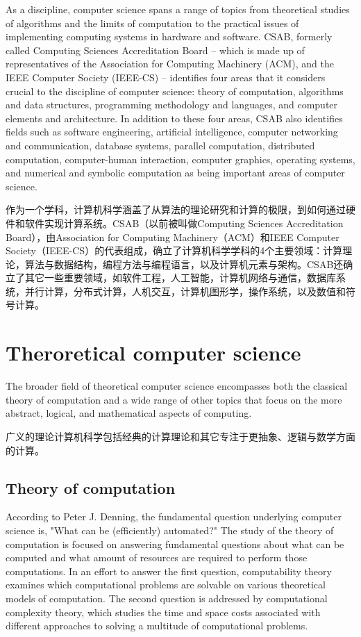 As a discipline, computer science spans a range of topics from theoretical studies of algorithms and the limits of computation to the practical issues of implementing computing systems in hardware and software. CSAB, formerly called Computing Sciences Accreditation Board – which is made up of representatives of the Association for Computing Machinery (ACM), and the IEEE Computer Society (IEEE-CS) – identifies four areas that it considers crucial to the discipline of computer science: theory of computation, algorithms and data structures, programming methodology and languages, and computer elements and architecture. In addition to these four areas, CSAB also identifies fields such as software engineering, artificial intelligence, computer networking and communication, database systems, parallel computation, distributed computation, computer-human interaction, computer graphics, operating systems, and numerical and symbolic computation as being important areas of computer science.

作为一个学科，计算机科学涵盖了从算法的理论研究和计算的极限，到如何通过硬件和软件实现计算系统。CSAB（以前被叫做Computing Sciences Accreditation Board），由Association for Computing Machinery（ACM）和IEEE Computer Society（IEEE-CS）的代表组成，确立了计算机科学学科的4个主要领域：计算理论，算法与数据结构，编程方法与编程语言，以及计算机元素与架构。CSAB还确立了其它一些重要领域，如软件工程，人工智能，计算机网络与通信，数据库系统，并行计算，分布式计算，人机交互，计算机图形学，操作系统，以及数值和符号计算。



\section{Theroretical computer science}

The broader field of theoretical computer science encompasses both the classical theory of computation and a wide range of other topics that focus on the more abstract, logical, and mathematical aspects of computing.

广义的理论计算机科学包括经典的计算理论和其它专注于更抽象、逻辑与数学方面的计算。

\subsection{Theory of computation}

According to Peter J. Denning, the fundamental question underlying computer science is, "What can be (efficiently) automated?" The study of the theory of computation is focused on answering fundamental questions about what can be computed and what amount of resources are required to perform those computations. In an effort to answer the first question, computability theory examines which computational problems are solvable on various theoretical models of computation. The second question is addressed by computational complexity theory, which studies the time and space costs associated with different approaches to solving a multitude of computational problems.

